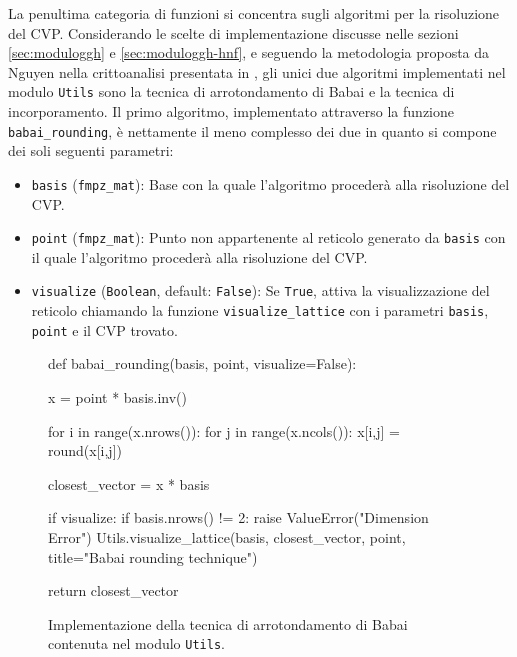 La penultima categoria di funzioni si concentra sugli algoritmi per la risoluzione del 
CVP. Considerando le scelte di implementazione discusse nelle sezioni \ref{sec:moduloggh}
 e \ref{sec:moduloggh-hnf}, e seguendo la metodologia proposta da Nguyen nella crittoanalisi 
presentata in 
\cite{Nguyen99}, gli unici due algoritmi implementati nel modulo \texttt{Utils} 
sono la tecnica di arrotondamento di Babai e la tecnica di incorporamento. Il primo 
algoritmo, implementato attraverso la funzione \texttt{babai\_rounding},
è nettamente il meno complesso dei due in quanto si compone dei soli seguenti parametri:
\begin{itemize}
    \item \texttt{basis} (\texttt{fmpz\_mat}): Base con la quale l'algoritmo procederà 
    alla risoluzione del CVP. 
    \item \texttt{point} (\texttt{fmpz\_mat}): Punto non appartenente al reticolo generato 
    da \texttt{basis} con il quale l'algoritmo procederà alla risoluzione del CVP.
    \item \texttt{visualize} (\texttt{Boolean}, default: \texttt{False}):
    Se \texttt{True}, attiva la visualizzazione del reticolo chiamando la funzione 
    \texttt{visualize\_lattice} con i parametri \texttt{basis}, \texttt{point} e il CVP trovato.
\end{itemize}

\begin{figure}[h]
    \begin{python}
        def babai_rounding(basis, point, visualize=False):

            x = point * basis.inv()

            for i in range(x.nrows()):
                for j in range(x.ncols()):
                    x[i,j] = round(x[i,j])
            
            closest_vector = x * basis  

            if visualize:
                if basis.nrows() != 2:
                    raise ValueError("Dimension Error")
                Utils.visualize_lattice(basis, closest_vector, 
                    point, title="Babai rounding technique")
                
            return closest_vector
    \end{python}
    \caption{Implementazione della tecnica di arrotondamento di Babai contenuta nel modulo 
    \texttt{Utils}.}
    \label{fig:utilsbabai}
\end{figure}

